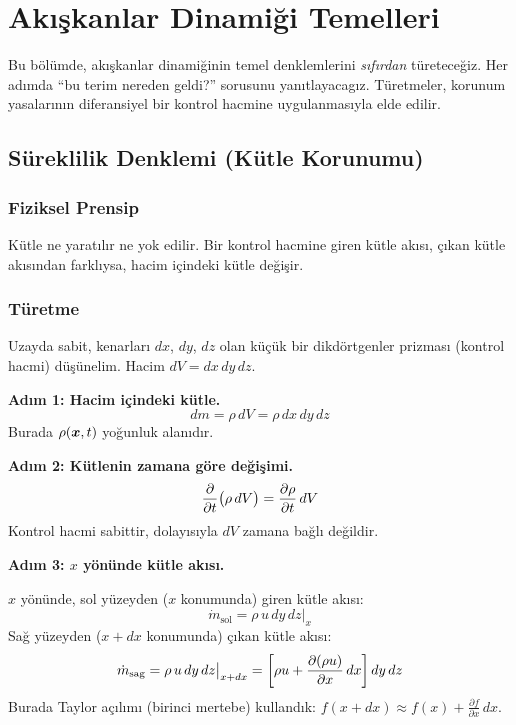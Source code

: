\chapter{Akışkanlar Dinamiği Temelleri}
\label{ch:akiskanlar}

Bu bölümde, akışkanlar dinamiğinin temel denklemlerini \textit{sıfırdan} türeteceğiz. Her adımda ``bu terim nereden geldi?'' sorusunu yanıtlayacagız. Türetmeler, korunum yasalarının diferansiyel bir kontrol hacmine uygulanmasıyla elde edilir.

\section{Süreklilik Denklemi (Kütle Korunumu)}
\label{sec:sureklilik}

\subsection{Fiziksel Prensip}
Kütle ne yaratılır ne yok edilir. Bir kontrol hacmine giren kütle akısı, çıkan kütle akısından farklıysa, hacim içindeki kütle değişir.

\subsection{Türetme}

Uzayda sabit, kenarları $dx$, $dy$, $dz$ olan küçük bir dikdörtgenler prizması (kontrol hacmi) düşünelim. Hacim $dV = dx\,dy\,dz$.

\textbf{Adım 1: Hacim içindeki kütle.}
\begin{equation}
    dm = \rho \, dV = \rho \, dx\,dy\,dz
    \label{eq:dm}
\end{equation}
Burada $\rho(\bm{x},t)$ yoğunluk alanıdır.

\textbf{Adım 2: Kütlenin zamana göre değişimi.}
\begin{equation}
    \frac{\partial }{\partial t}\bigl(\rho \, dV\bigr) = \frac{\partial \rho}{\partial t}\,dV
    \label{eq:dm_dt}
\end{equation}
Kontrol hacmi sabittir, dolayısıyla $dV$ zamana bağlı değildir.

\textbf{Adım 3: $x$ yönünde kütle akısı.}

$x$ yönünde, sol yüzeyden ($x$ konumunda) giren kütle akısı:
\begin{equation}
    \dot{m}_{\text{sol}} = \rho \, u \, dy\,dz \big|_{x}
\end{equation}
Sağ yüzeyden ($x+dx$ konumunda) çıkan kütle akısı:
\begin{equation}
    \dot{m}_{\text{sag}} = \rho \, u \, dy\,dz \big|_{x+dx}
    = \left[\rho u + \frac{\partial (\rho u)}{\partial x}\,dx \right] dy\,dz
\end{equation}
Burada Taylor açılımı (birinci mertebe) kullandık: $f(x+dx) \approx f(x) + \frac{\partial f}{\partial x}\,dx$.

